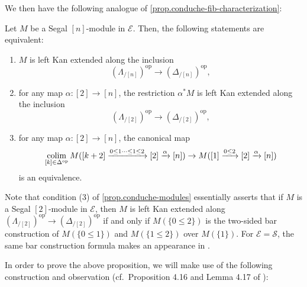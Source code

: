 \documentclass[a4paper, 11pt]{amsart}
\numberwithin{theorem}{section}
\theoremstyle{definition}
\newcommand{\op}{\mathrm{op}}
\def\colim{\qopname\relax m{colim}}
\renewcommand{\S}{\mathscr{S}}
\newcommand{\E}{\mathscr{E}}
\begin{document}
We then have the following analogue of \cref{prop.conduche-fib-characterization}:

\begin{proposition}\label{prop.conduche-modules}
	Let $M$ be a Segal $[n]$-module in $\E$. Then, the following statements are equivalent: 
	\begin{enumerate}
		\item $M$ is left Kan extended along the inclusion $$(\Lambda_{/[n]})^\op \rightarrow (\Delta_{/[n]})^\op,$$
		\item for any map $\alpha : [2] \rightarrow [n]$, the restriction $\alpha^*M$ is left Kan extended along the inclusion 
		$$(\Lambda_{/[2]})^\op \rightarrow (\Delta_{/[2]})^\op,$$
		\item for any map $\alpha : [2] \rightarrow [n]$, the canonical map 
		$$
		\colim_{[k] \in \Delta^\op} M([k+2] \xrightarrow{0 \leq 1 \dotsb \leq 1\leq 2} [2] \xrightarrow{\alpha}
		 [n]) \rightarrow M([1] \xrightarrow{0\leq 2} [2] \xrightarrow{\alpha} [n])
		$$
		is an equivalence.
	\end{enumerate}
\end{proposition}

\begin{remark}
Note that condition (3) of \cref{prop.conduche-modules} essentially asserts that if $M$ is a Segal $[2]$-module in $\E$, then $M$ is 
left Kan extended along $(\Lambda_{/[2]})^\op \rightarrow (\Delta_{/[2]})^\op$ if and only if $M(\{0\leq 2\})$ is the two-sided bar construction 
of $M(\{0 \leq 1\})$ and $M(\{1 \leq 2\})$ over $M(\{1\})$. For $\E = \S$, the same bar construction formula makes an appearance in \cite[Lemma 5.16(5)]{AyalaFrancisRozenblyum}.
\end{remark}

In order to prove the above proposition, we will make use of the following construction and observation (cf.\ Proposition 4.16 and Lemma 4.17 of \cite{HaugsengMorita}):
\end{document}
